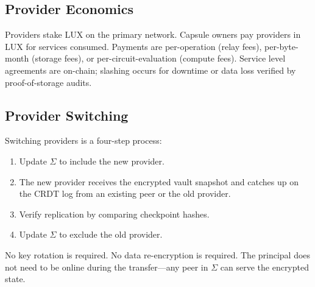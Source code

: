 \subsection{Provider Economics}

Providers stake LUX on the primary network. Capsule owners pay providers in LUX
for services consumed. Payments are per-operation (relay fees), per-byte-month
(storage fees), or per-circuit-evaluation (compute fees). Service level
agreements are on-chain; slashing occurs for downtime or data loss verified
by proof-of-storage audits.

\subsection{Provider Switching}

Switching providers is a four-step process:
\begin{enumerate}[nosep]
  \item Update $\Sigma$ to include the new provider.
  \item The new provider receives the encrypted vault snapshot and catches up
        on the CRDT log from an existing peer or the old provider.
  \item Verify replication by comparing checkpoint hashes.
  \item Update $\Sigma$ to exclude the old provider.
\end{enumerate}

No key rotation is required. No data re-encryption is required. The principal
does not need to be online during the transfer---any peer in $\Sigma$ can serve
the encrypted state.

